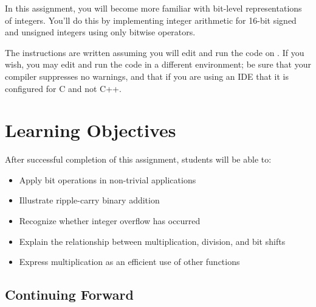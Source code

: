 

\usepackage{cancel}

\renewcommand{\labnumber}{4}
\renewcommand{\labname}{Integer Representation and Arithmetic Lab}
\renewcommand{\shortlabname}{integerlab}
\renewcommand{\collaborationrules}{\individualeffort}
\renewcommand{\duedate}{Week of February 14, before the start of your lab section}
\startdocument




In this assignment, you will become more familiar with bit-level
representations of integers.  You'll do this by implementing integer arithmetic
for 16-bit signed and unsigned integers using only bitwise operators.

The instructions are written assuming you will edit and run the code on
\runtimeenvironment. If you wish, you may edit and run the code
in a different environment; be sure that your compiler suppresses no warnings,
and that if you are using an IDE that it is configured for C and not C++.

\section*{Learning Objectives}

After successful completion of this assignment, students will be able to:
\begin{itemize}
\item Apply bit operations in non-trivial applications
\item Illustrate ripple-carry binary addition
\item Recognize whether integer overflow has occurred
\item Explain the relationship between multiplication, division, and bit shifts
\item Express multiplication as an efficient use of other functions

\end{itemize}

\subsection*{Continuing Forward}

